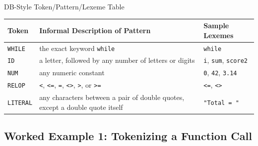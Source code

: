 \documentclass[full-course-notes.tex]{subfiles}
\begin{document}
\begin{center}
\end{center}

\begin{examplebox}{DB-Style Token/Pattern/Lexeme Table}
\renewcommand{\arraystretch}{1.3}
\begin{tabularx}{\textwidth}{@{}l X l@{}}
\toprule
\textbf{Token} & \textbf{Informal Description of Pattern} & \textbf{Sample Lexemes} \\
\midrule
\texttt{WHILE} & the exact keyword \texttt{while} & \texttt{while} \\
\texttt{ID} & a letter, followed by any number of letters or digits & \texttt{i}, \texttt{sum}, \texttt{score2} \\
\texttt{NUM} & any numeric constant & \texttt{0}, \texttt{42}, \texttt{3.14} \\
\texttt{RELOP} & \texttt{<}, \texttt{<=}, \texttt{=}, \texttt{<>}, \texttt{>}, or \texttt{>=} & \texttt{<=}, \texttt{<>} \\
\texttt{LITERAL} & any characters between a pair of double quotes, except a double quote itself & \texttt{"Total = "} \\
\bottomrule
\end{tabularx}
\end{examplebox}

\subsection{Worked Example 1: Tokenizing a Function Call}
\label{sec:l3-worked-example-1}
\end{document}
